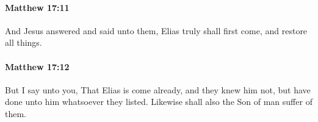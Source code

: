 		\paragraph{Matthew 17:11} %
			\label{MATTHEW-17-11}

			And Jesus answered and said unto them, Elias truly shall first come, and restore all things.

			\begin{framed}
			\scriptsize
				\begin{compactdesc}
					\item[SBLG] 
				\end{compactdesc}
			\end{framed}

		\paragraph{Matthew 17:12} %
			\label{MATTHEW-17-12}

			But I say unto you, That Elias is come already, and they knew him not, but have done unto him whatsoever they listed. Likewise shall also the Son of man suffer of them.

